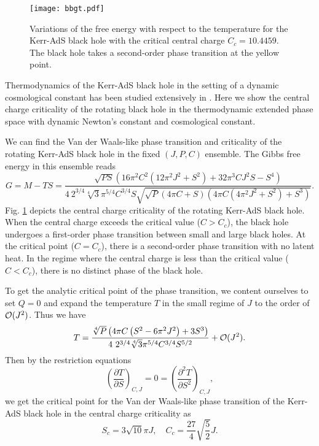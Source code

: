 \documentclass[a4paper,11pt]{article}
\newcommand{\fig}[1]{Fig. \ref{#1}}
\begin{document}
\begin{figure}[tbp!]
\begin{center}
\texttt{[image: bbgt.pdf]}
\end{center}
\vspace{-5mm}
 \caption {Variations of the free energy with respect to the temperature for the Kerr-AdS black hole with the critical central charge $C_c=10.4459$. The black hole takes a second-order phase transition at the  yellow point. }
 \label{fig0}
\end{figure}


Thermodynamics of the Kerr-AdS black hole in the setting of a dynamic cosmological constant has been studied extensively in  \cite{Gunasekaran:2012dq,Altamirano:2013uqa,Altamirano:2013ane,Wei:2015ana,Yang:2021ljn}. Here we show the central charge criticality of the rotating black hole in the thermodynamic extended phase space with dynamic Newton's constant and cosmological constant. 

We can find the Van der Waals-like phase transition and criticality of the rotating Kerr-AdS black hole in the fixed $(J, P, C)$ ensemble. The Gibbs free energy in this ensemble reads
\begin{equation}
G=M-TS=\frac{\sqrt{PS} \left(16 \pi ^2 C^2 \left(12 \pi ^2 J^2+S^2\right)+32 \pi ^3 C J^2 S-S^4\right)}{4\ 2^{3/4} \sqrt[4]{3} \pi ^{5/4} C^{3/4} S \sqrt{\sqrt{P} (4 \pi  C+S) \left(4 \pi  C \left(4 \pi ^2 J^2+S^2\right)+S^3\right)}}.
\end{equation}
\fig{fig0} depicts the central charge criticality of  the rotating Kerr-AdS black hole. When the central charge exceeds the critical value ($C>C_c$), the black hole undergoes a first-order phase transition between small and large black holes. At the critical point ($C=C_c$), there is a second-order phase transition with no latent heat. In the regime where the central charge is less than the critical value ($C<C_c$), there is no distinct phase of the black hole. 

To get the analytic critical point of the phase transition, we content ourselves to set $Q=0$ and expand the temperature $T$ in the small regime of $J$ to the order of $\mathcal{O}(J^2)$. Thus we have
\begin{equation}
T=\frac{\sqrt[4]{P} \left(4 \pi  C \left(S^2-6 \pi ^2 J^2\right)+3 S^3\right)}{4\ 2^{3/4} \sqrt[4]{3} \pi ^{5/4} C^{3/4} S^{5/2}}+\mathcal{O}(J^2).
\end{equation}
Then by the restriction equations
\begin{equation}\label{crit}
\left(\frac{\partial T}{\partial S}\right)_{C, J}=0=\left(\frac{\partial^2 T}{\partial S^2}\right)_{C, J},
\end{equation}
we get the critical point for the Van der Waals-like phase transition of the Kerr-AdS black hole in the central charge criticality as
\begin{equation}
S_c= 3 \sqrt{10} \pi  J,\quad C_c=\frac{27}{4} \sqrt{\frac{5}{2}} J.
\end{equation}
\end{document}
